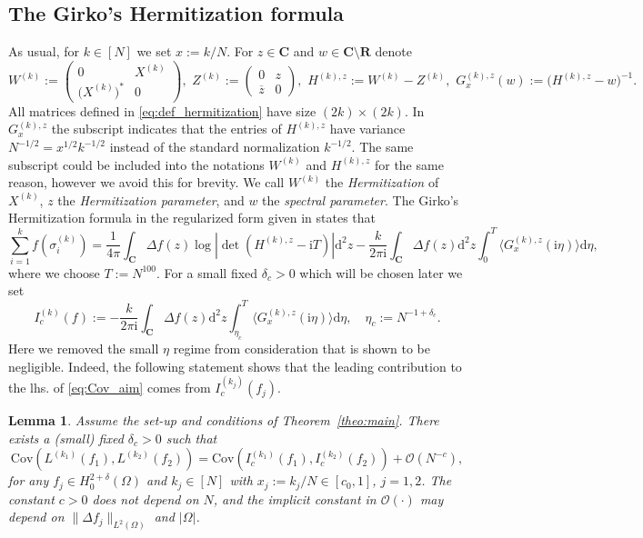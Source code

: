 \documentclass[10pt]{amsart}
\newtheorem{lemma}[theorem]{Lemma}
\numberwithin{equation}{section}
\newcommand{\dif}{\mathrm{d}}
\newcommand{\R}{\mathbf{R}}
\newcommand{\C}{\mathbf{C}}
\newcommand{\ii}{\mathrm{i}}
\begin{document}
\subsection{The Girko's Hermitization formula}\label{sec:strategy_Girko} As usual,  for $k\in[N]$ we set $x:=k/N$. For $z\in \C$ and $w\in\C\setminus\R$ denote
\begin{equation}
W^{(k)}:=\begin{pmatrix}
0&X^{(k)}\\\big(X^{(k)}\big)^*&0
\end{pmatrix},\,\,
Z^{(k)}:=\begin{pmatrix}
0&z\\
\overline{z}&0
\end{pmatrix},\,\,H^{(k),z}:=W^{(k)}-Z^{(k)},\,\, G^{(k),z}_x(w):=\big( H^{(k),z}-w\big)^{-1}. 
\label{eq:def_hermitization}
\end{equation}
All matrices defined in \eqref{eq:def_hermitization} have size $(2k)\times (2k)$. In $G^{(k),z}_x$ the subscript indicates that the entries of $H^{(k),z}$ have variance $N^{-1/2} = x^{1/2}k^{-1/2}$ instead of the standard normalization $k^{-1/2}$. The same subscript could be included into the notations $W^{(k)}$ and $H^{(k),z}$ for the same reason, however we avoid this for brevity. We call $W^{(k)}$ the \emph{Hermitization} of $X^{(k)}$, $z$ the \emph{Hermitization parameter}, and $w$ the \emph{spectral parameter}. The Girko's Hermitization formula \cite{Girko84} in the regularized form given in \cite{TaoVu15} states that
\begin{equation}
\sum_{i=1}^k f(\sigma_i^{(k)})=\frac{1}{4\pi} \int_\C \Delta f(z) \log\left\vert \det (H^{(k),z}-\ii T)\right\vert \dif^2 z - \frac{k}{2\pi\ii} \int_\C \Delta f(z)\dif^2 z \int_0^T \big\langle G^{(k),z}_x(\ii\eta)\big\rangle\dif \eta,
\label{eq:Girko}
\end{equation}
where we choose $T:=N^{100}$. For a small fixed $\delta_c>0$ which will be chosen later we set
\begin{equation}
I_{c}^{(k)}(f):=- \frac{k}{2\pi\ii} \int_{\C} \Delta f(z)\dif^2 z \int_{\eta_c}^{T} \big\langle G^{(k),z}_x(\ii\eta)\big\rangle\dif \eta,\quad \eta_c:=N^{-1+\delta_c}.
\label{eq:def_I_c}
\end{equation}
Here we removed the small $\eta$ regime from consideration that is shown to be negligible. Indeed, the following statement shows that the leading contribution to the lhs. of \eqref{eq:Cov_aim} comes from $I_c^{(k_j)}(f_j)$.

\begin{lemma}\label{lem:Girko_reduction} Assume the set-up and conditions of Theorem~\ref{theo:main}. There exists a (small) fixed $\delta_c>0$ such that
\begin{equation}
\mathrm{Cov}\left(L^{(k_1)}(f_1), L^{(k_2)}(f_2)\right) = \mathrm{Cov}\left(I_{c}^{(k_1)}(f_1), I_{c}^{(k_2)}(f_2)\right) + \mathcal{O}(N^{-c}),
\label{eq:Girko_reduction}
\end{equation}
for any $f_j\in H^{2+\delta}_0(\Omega)$ and $k_j\in[N]$ with $x_j:=k_j/N\in [c_0,1]$, $j=1,2$. The constant $c>0$ does not depend on $N$, and the implicit constant in $\mathcal{O}(\cdot)$ may depend on $\|\Delta f_j\|_{L^2(\Omega)}$ and $|\Omega|$. 
\end{lemma}
\end{document}
